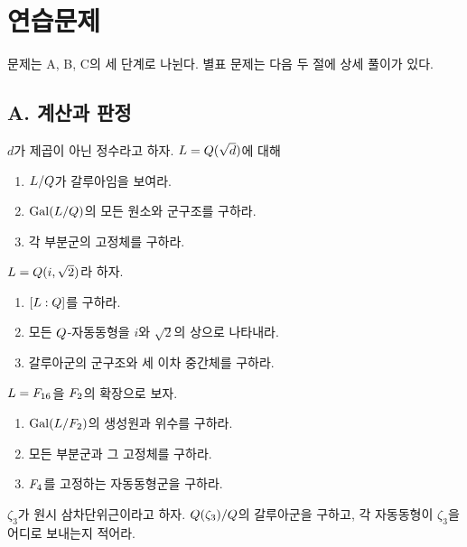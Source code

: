 \section{연습문제}
\label{sec:galois-gateway-exercises}

문제는 A, B, C의 세 단계로 나뉜다. 별표 문제는 다음 두 절에 상세 풀이가 있다.

\subsection*{A. 계산과 판정}

\begin{exercise}[*]
$d$가 제곱이 아닌 정수라고 하자. $L=Q(\sqrt d)$에 대해
\begin{enumerate}[label=(\alph*)]
  \item $L/Q$가 갈루아임을 보여라.
  \item $\operatorname{Gal}(L/Q)$의 모든 원소와 군구조를 구하라.
  \item 각 부분군의 고정체를 구하라.
\end{enumerate}
\end{exercise}

\begin{exercise}[*]
$L=Q(i,\sqrt2)$라 하자.
\begin{enumerate}[label=(\alph*)]
  \item $[L:Q]$를 구하라.
  \item 모든 $Q$-자동동형을 $i$와 $\sqrt2$의 상으로 나타내라.
  \item 갈루아군의 군구조와 세 이차 중간체를 구하라.
\end{enumerate}
\end{exercise}

\begin{exercise}[*]
$L=F_{16}$을 $F_2$의 확장으로 보자.
\begin{enumerate}[label=(\alph*)]
  \item $\operatorname{Gal}(L/F_2)$의 생성원과 위수를 구하라.
  \item 모든 부분군과 그 고정체를 구하라.
  \item $F_4$를 고정하는 자동동형군을 구하라.
\end{enumerate}
\end{exercise}

\begin{exercise}
$\zeta_3$가 원시 삼차단위근이라고 하자. $Q(\zeta_3)/Q$의 갈루아군을 구하고, 각 자동동형이 $\zeta_3$을 어디로 보내는지 적어라.
\end{exercise}

